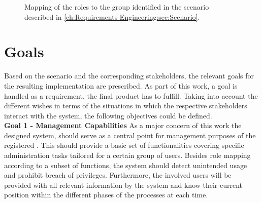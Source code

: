 \begin{figure}[h]
    \centering
    \caption{Mapping of the roles to the group identified in the scenario described in \ref{ch:Requirements Engineering:sec:Scenario}.}
    \label{fig:role-mapping}
\end{figure}

\section{Goals}
\label{ch:Requirements Engineering:sec:Goals}

Based on the scenario and the corresponding stakeholders, the relevant goals for the resulting implementation are prescribed. As part of this work, a goal is handled as a requirement, the final product has to fulfill.
Taking into account the different wishes in terms of the situations in which the respective stakeholders interact with the system, the following objectives could be defined. \\

\noindent \textbf{Goal 1 - Management Capabilities} As a major concern of this work the designed system, should serve as a central point for management purposes of the registered . This should provide a basic set of functionalities covering specific administration tasks tailored for a certain group of users.
Besides role mapping according to a subset of functions, the system should detect unintended usage and prohibit breach of privileges.
Furthermore, the involved users will be provided with all relevant information by the system and know their current position within the different phases of the processes at each time. \\

